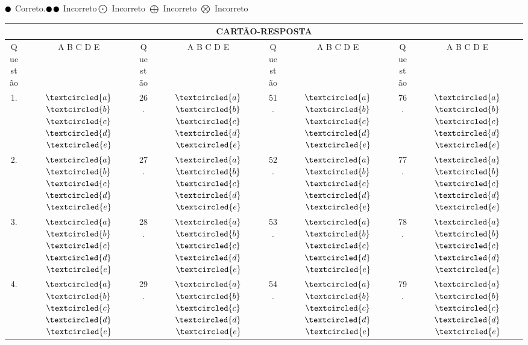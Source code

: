 \documentclass[14pt]{report}
\begin{document}
$\newmoon$ Correto.\hspace{2.5cm}$\newmoon$$\newmoon$ Incorreto\hspace{2.5cm}$\bigodot$ Incorreto\hspace{2.5cm} $\bigoplus$ Incorreto\hspace{2.5cm} $\bigotimes$ Incorreto
\Large
\begin{center}
\begin{tabular}{ |c|c|c|c|c|c|c|c|}
 \hline
 \multicolumn{8}{|c|}{\vspace*{1cm}\LARGE{\textbf{CARTÃO-RESPOSTA}}}\\
 \hline
 \centering Questão &  A B C D E &Questão &  A B C D E&Questão&A B C D E&Questão&A B C D E\\
 \hline
 1. & $\textcircled{a}$$\textcircled{b}$$\textcircled{c}$$\textcircled{d}$$\textcircled{e}$&26.&$\textcircled{a}$$\textcircled{b}$$\textcircled{c}$$\textcircled{d}$$\textcircled{e}$&51.&$\textcircled{a}$$\textcircled{b}$$\textcircled{c}$$\textcircled{d}$$\textcircled{e}$&76.&$\textcircled{a}$$\textcircled{b}$$\textcircled{c}$$\textcircled{d}$$\textcircled{e}$ \\
2. & $\textcircled{a}$$\textcircled{b}$$\textcircled{c}$$\textcircled{d}$$\textcircled{e}$&27.&$\textcircled{a}$$\textcircled{b}$$\textcircled{c}$$\textcircled{d}$$\textcircled{e}$&52.&$\textcircled{a}$$\textcircled{b}$$\textcircled{c}$$\textcircled{d}$$\textcircled{e}
$&77.&$\textcircled{a}$$\textcircled{b}$$\textcircled{c}$$\textcircled{d}$$\textcircled{e}$ \\
 3. & $\textcircled{a}$$\textcircled{b}$$\textcircled{c}$$\textcircled{d}$$\textcircled{e}$&28.&$\textcircled{a}$$\textcircled{b}$$\textcircled{c}$$\textcircled{d}$$\textcircled{e}$&53.&$\textcircled{a}$$\textcircled{b}$$\textcircled{c}$$\textcircled{d}$$\textcircled{e}$&78.&$\textcircled{a}$$\textcircled{b}$$\textcircled{c}$$\textcircled{d}$$\textcircled{e}$ \\
4. & $\textcircled{a}$$\textcircled{b}$$\textcircled{c}$$\textcircled{d}$$\textcircled{e}$&29.&$\textcircled{a}$$\textcircled{b}$$\textcircled{c}$$\textcircled{d}$$\textcircled{e}$&54.&$\textcircled{a}$$\textcircled{b}$$\textcircled{c}$$\textcircled{d}$$\textcircled{e}$&79.&$\textcircled{a}$$\textcircled{b}$$\textcircled{c}$$\textcircled{d}$$\textcircled{e}$ \\

\end{tabular}
\end{center}$$
\end{document}
